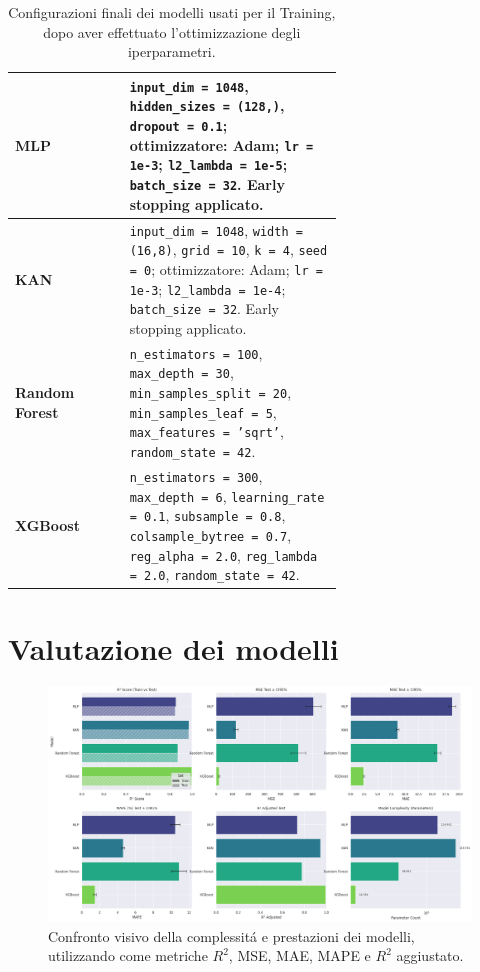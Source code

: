 \documentclass[a4paper,12pt]{report}
\begin{document}
	\begin{table}[H]
		\centering
		\caption{Configurazioni finali dei modelli usati per il Training, dopo aver effettuato l'ottimizzazione degli iperparametri.}
		\label{tab:model-config-car}
		\begin{tabular}{l p{0.65\linewidth}}
			\toprule
			\textbf{MLP} & \texttt{input\_dim = 1048}, \texttt{hidden\_sizes = (128,)}, \texttt{dropout = 0.1}; ottimizzatore: Adam; \texttt{lr = 1e-3}; \texttt{l2\_lambda = 1e-5}; \texttt{batch\_size = 32}. Early stopping applicato. \\
			\midrule
			\textbf{KAN} & \texttt{input\_dim = 1048}, \texttt{width = (16,8)}, \texttt{grid = 10}, \texttt{k = 4}, \texttt{seed = 0}; ottimizzatore: Adam; \texttt{lr = 1e-3}; \texttt{l2\_lambda = 1e-4}; \texttt{batch\_size = 32}. Early stopping applicato. \\
			\midrule
			\textbf{Random Forest} & \texttt{n\_estimators = 100}, \texttt{max\_depth = 30}, \texttt{min\_samples\_split = 20}, \texttt{min\_samples\_leaf = 5}, \texttt{max\_features = 'sqrt'}, \texttt{random\_state = 42}. \\
			\midrule
			\textbf{XGBoost} & \texttt{n\_estimators = 300}, \texttt{max\_depth = 6}, \texttt{learning\_rate = 0.1}, \texttt{subsample = 0.8}, \texttt{colsample\_bytree = 0.7}, \texttt{reg\_alpha = 2.0}, \texttt{reg\_lambda = 2.0}, \texttt{random\_state = 42}. \\
			\bottomrule
		\end{tabular}
	\end{table}
	
	\section{Valutazione dei modelli}
	
	\begin{figure}[H]
		\centering
		\includegraphics[width=1.0\textwidth]{img/comparison_car.png}
		\caption{Confronto visivo della complessitá e prestazioni dei modelli, utilizzando come metriche $R^2$, MSE, MAE, MAPE e $R^2$ aggiustato.}
		\label{fig:comparison_models}
	\end{figure}
	
\end{document}
